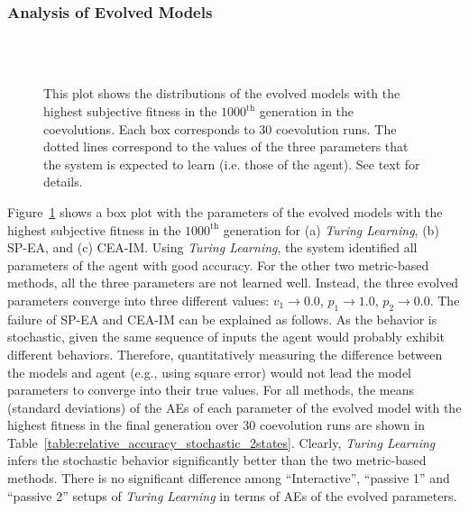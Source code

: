 
\subsubsection{Analysis of Evolved Models}
\begin{figure}[!t]%
	\centering
		\\
		\\
		\caption{This plot shows the distributions of the evolved models with the highest subjective fitness in the $1000^\textrm{th}$ generation in the coevolutions. Each box corresponds to $30$ coevolution runs. The dotted lines correspond to the values of the three parameters that the system is expected to learn (i.e. those of the agent). See text for details.\label{fig:parameters_box_stochastic_two states}}
\end{figure}

Figure~\ref{fig:parameters_box_stochastic_two states} shows a box plot with the parameters of the evolved models with the highest subjective fitness in the $1000^\mathrm{th}$ generation for (a) \textit{Turing Learning}, (b) SP-EA, and (c) CEA-IM. Using \textit{Turing Learning}, the system identified all parameters of the agent with good accuracy. For the other two metric-based methods, all the three parameters are not learned well. Instead, the three evolved parameters converge into three different values: $v_1 \rightarrow 0.0$, $p_1 \rightarrow 1.0$, $p_2 \rightarrow 0.0$. The failure of SP-EA and CEA-IM can be explained as follows. As the behavior is stochastic, given the same sequence of inputs the agent would probably exhibit different behaviors. Therefore, quantitatively measuring the difference between the models and agent (e.g., using square error) would not lead the model parameters to converge into their true values. For all methods, the means (standard deviations) of the AEs of each parameter of the evolved model with the highest fitness in the final generation over $30$ coevolution runs are shown in Table~\ref{table:relative_accuracy_stochastic_2states}. Clearly, \textit{Turing Learning} infers the stochastic behavior significantly better than the two metric-based methods. There is no significant difference among ``Interactive'', ``passive 1'' and ``passive 2'' setups of \textit{Turing Learning} in terms of AEs of the evolved parameters. 

